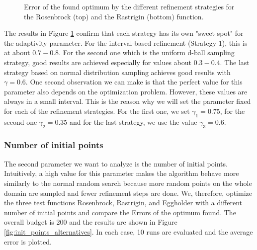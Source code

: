 \begin{figure}[H]
	\caption{ Error of the found optimum by the different refinement strategies for the Rosenbrock (top) and the Rastrigin (bottom) function. }	
	\label{fig:alternatives_adaptivities_plot}
\end{figure}

The results in Figure \ref{fig:alternatives_adaptivities_plot} confirm that each strategy has its own "sweet spot" for the adaptivity parameter. For the interval-based refinement (Strategy 1), this is at about $ 0.7 - 0.8 $. For the second one which is the uniform d-ball sampling strategy, good results are achieved especially for values about $ 0.3 - 0.4 $. The last strategy based on normal distribution sampling achieves good results with $ \gamma = 0.6 $. One second observation we can make is that the perfect value for this parameter also depends on the optimization problem. However, these values are always in a small interval. This is the reason why we will set the parameter fixed for each of the refinement strategies. For the first one, we set $ \gamma_1 = 0.75 $, for the second one $ \gamma_2 = 0.35 $ and for the last strategy, we use the value $ \gamma_3 = 0.6 $. 

\subsubsection{Number of initial points}

The second parameter we want to analyze is the number of initial points. Intuitively, a high value for this parameter makes the algorithm behave more similarly to the normal random search because more random points on the whole domain are sampled and fewer refinement steps are done. We, therefore, optimize the three test functions Rosenbrock, Rastrigin, and Eggholder with a different number of initial points and compare the Errors of the optimum found. The overall budget is 200 and the results are shown in Figure \ref{fig:init_points_alternatives}. In each case, 10 runs are evaluated and the average error is plotted. \newline

